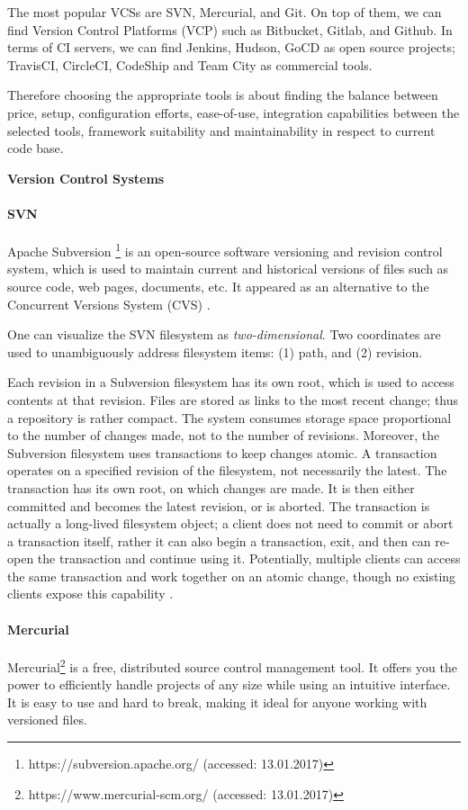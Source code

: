 The most popular VCSs are SVN, Mercurial, and Git. On top of them, we can find Version Control Platforms (VCP) such as Bitbucket, Gitlab, and Github. In terms of CI servers, we can find Jenkins, Hudson, GoCD as open source projects; TravisCI, CircleCI, CodeShip and Team City as commercial tools.

Therefore choosing the appropriate tools is about finding the balance between price, setup, configuration efforts, ease-of-use, integration capabilities between the selected tools, framework suitability and maintainability in respect to current code base.

\textbf{Version Control Systems}

\paragraph{SVN}
Apache Subversion \footnote{https://subversion.apache.org/ (accessed: 13.01.2017)} is an open-source software versioning and revision control system, which is used to maintain current and historical versions of files such as source code, web pages, documents, etc. It appeared as an alternative to the Concurrent Versions System (CVS) \cite{Pilato2008}.

One can visualize the SVN filesystem as \emph{two-dimensional}. Two coordinates are used to unambiguously address filesystem items: (1) path, and (2) revision.

Each revision in a Subversion filesystem has its own root, which is used to access contents at that revision. Files are stored as links to the most recent change; thus a repository is rather compact. The system consumes storage space proportional to the number of changes made, not to the number of revisions. Moreover, the Subversion filesystem uses transactions to keep changes atomic. A transaction operates on a specified revision of the filesystem, not necessarily the latest. The transaction has its own root, on which changes are made. It is then either committed and becomes the latest revision, or is aborted. The transaction is actually a long-lived filesystem object; a client does not need to commit or abort a transaction itself, rather it can also begin a transaction, exit, and then can re-open the transaction and continue using it. Potentially, multiple clients can access the same transaction and work together on an atomic change, though no existing clients expose this capability \cite{Pilato2008}.
\paragraph{Mercurial}
Mercurial\footnote{https://www.mercurial-scm.org/ (accessed: 13.01.2017)} is a free, distributed source control management tool. It offers you the power to efficiently handle projects of any size while using an intuitive interface. It is easy to use and hard to break, making it ideal for anyone working with versioned files.

